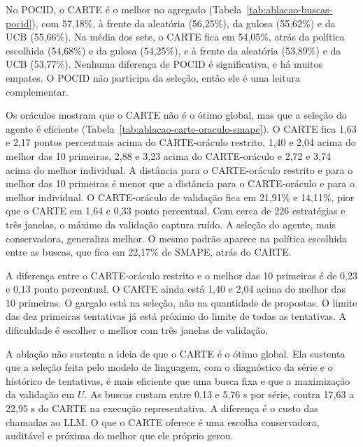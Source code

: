 No POCID, o CARTE é o melhor no agregado (Tabela~\ref{tab:ablacao-buscas-pocid}), com 57,18\%, à frente da aleatória (56,25\%), da gulosa (55,62\%) e da UCB (55,66\%). Na média dos sete, o CARTE fica em 54,05\%, atrás da política escolhida (54,68\%) e da gulosa (54,25\%), e à frente da aleatória (53,89\%) e da UCB (53,77\%). Nenhuma diferença de POCID é significativa, e há muitos empates. O POCID não participa da seleção, então ele é uma leitura complementar.

Os oráculos mostram que o CARTE não é o ótimo global, mas que a seleção do agente é eficiente (Tabela~\ref{tab:ablacao-carte-oraculo-smape}). O CARTE fica 1,63 e 2,17 pontos percentuais acima do CARTE-oráculo restrito, 1,40 e 2,04 acima do melhor das 10 primeiras, 2,88 e 3,23 acima do CARTE-oráculo e 2,72 e 3,74 acima do melhor individual. A distância para o CARTE-oráculo restrito e para o melhor das 10 primeiras é menor que a distância para o CARTE-oráculo e para o melhor individual. O CARTE-oráculo de validação fica em 21,91\% e 14,11\%, pior que o CARTE em 1,64 e 0,33 ponto percentual. Com cerca de 226 estratégias e três janelas, o máximo da validação captura ruído. A seleção do agente, mais conservadora, generaliza melhor. O mesmo padrão aparece na política escolhida entre as buscas, que fica em 22,17\% de SMAPE, atrás do CARTE.

A diferença entre o CARTE-oráculo restrito e o melhor das 10 primeiras é de 0,23 e 0,13 ponto percentual. O CARTE ainda está 1,40 e 2,04 acima do melhor das 10 primeiras. O gargalo está na seleção, não na quantidade de propostas. O limite das dez primeiras tentativas já está próximo do limite de todas as tentativas. A dificuldade é escolher o melhor com três janelas de validação.

A ablação não sustenta a ideia de que o CARTE é o ótimo global. Ela sustenta que a seleção feita pelo modelo de linguagem, com o diagnóstico da série e o histórico de tentativas, é mais eficiente que uma busca fixa e que a maximização da validação em $U$. As buscas custam entre 0,13 e 5,76 s por série, contra 17,63 a 22,95 s do CARTE na execução representativa. A diferença é o custo das chamadas ao LLM. O que o CARTE oferece é uma escolha conservadora, auditável e próxima do melhor que ele próprio gerou.

